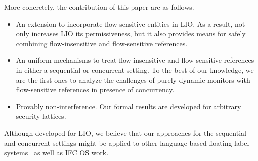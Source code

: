 More concretely, the contribution of this paper are as follows.
\begin{itemize}

\item An extension to incorporate flow-sensitive entities in LIO. As a result,
  not only increases LIO its permissiveness, but it also provides means for safely
  combining flow-insensitive and flow-sensitive references. 

\item An uniform mechanisms to treat flow-insensitive and flow-sensitive
  references in either a sequential or concurrent setting. To the best of our
  knowledge, we are the first ones to analyze the challenges of purely dynamic
  monitors with flow-sensitive references in presence of concurrency.

\item Provably non-interference. Our formal results are developed for arbitrary
  security lattices. 

\end{itemize}

Although developed for LIO, we believe that our approaches for the sequential
and concurrent settings might be applied to other language-based floating-label
systems~\citep[e.g.][]{10.1109/SP.2013.10} as well as IFC OS work.

